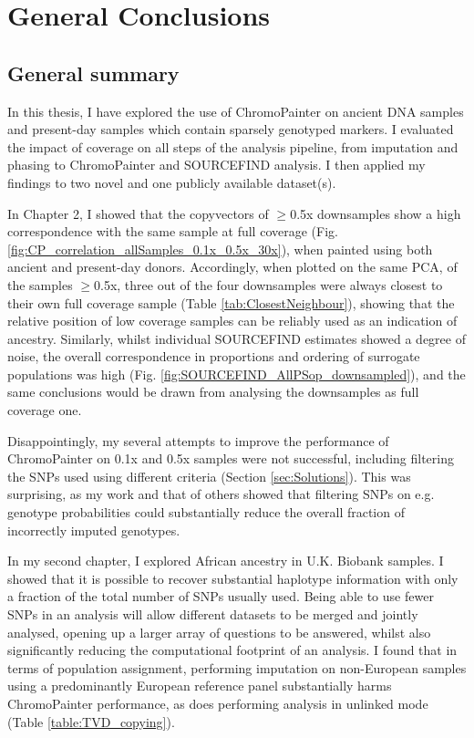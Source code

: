 \chapter{General Conclusions}
\label{chapterlabelConclusions}

\section{General summary}

In this thesis, I have explored the use of ChromoPainter on ancient DNA samples and present-day samples which contain sparsely genotyped markers. I evaluated the impact of coverage on all steps of the analysis pipeline, from imputation and phasing to ChromoPainter and SOURCEFIND analysis. I then applied my findings to two novel and one publicly available dataset(s). 

In Chapter 2, I showed that the copyvectors of $\geq$0.5x downsamples show a high correspondence with the same sample at full coverage (Fig. \ref{fig:CP_correlation_allSamples_0.1x_0.5x_30x}), when painted using both ancient and present-day donors. Accordingly, when plotted on the same PCA, of the samples $\geq$0.5x, three out of the four downsamples were always closest to their own full coverage sample (Table \ref{tab:ClosestNeighbour}), showing that the relative position of low coverage samples can be reliably used as an indication of ancestry. Similarly, whilst individual SOURCEFIND estimates showed a degree of noise, the overall correspondence in proportions and ordering of surrogate populations was high (Fig. \ref{fig:SOURCEFIND_AllPSop_downsampled}), and the same conclusions would be drawn from analysing the downsamples as full coverage one. 

Disappointingly, my several attempts to improve the performance of ChromoPainter on 0.1x and 0.5x samples were not successful, including filtering the SNPs used using different criteria (Section \ref{sec:Solutions}). This was surprising, as my work and that of others \cite{hui2020evaluating} showed that filtering SNPs on e.g. genotype probabilities could substantially reduce the overall fraction of incorrectly imputed genotypes. 

In my second chapter, I explored African ancestry in U.K. Biobank samples. I showed that it is possible to recover substantial haplotype information with only a fraction of the total number of SNPs usually used. Being able to use fewer SNPs in an analysis will allow different datasets to be merged and jointly analysed, opening up a larger array of questions to be answered, whilst also significantly reducing the computational footprint of an analysis. I found that in terms of population assignment, performing imputation on non-European samples using a predominantly European reference panel substantially harms ChromoPainter performance, as does performing analysis in unlinked mode (Table \ref{table:TVD_copying}). 


